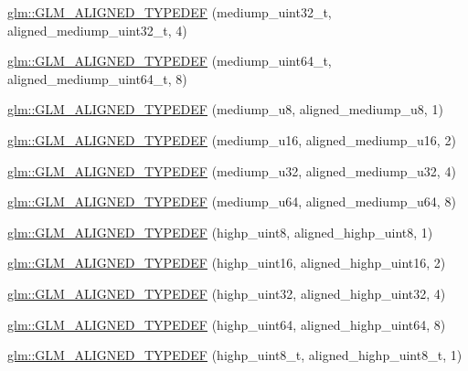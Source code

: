\begin{DoxyCompactItemize}
\item 
\hyperlink{group__gtx__type__aligned_ga1dc8bc6199d785f235576948d80a597c}{glm\+::\+G\+L\+M\+\_\+\+A\+L\+I\+G\+N\+E\+D\+\_\+\+T\+Y\+P\+E\+D\+E\+F} (mediump\+\_\+uint32\+\_\+t, aligned\+\_\+mediump\+\_\+uint32\+\_\+t, 4)
\item 
\hyperlink{group__gtx__type__aligned_gad14a0f2ec93519682b73d70b8e401d81}{glm\+::\+G\+L\+M\+\_\+\+A\+L\+I\+G\+N\+E\+D\+\_\+\+T\+Y\+P\+E\+D\+E\+F} (mediump\+\_\+uint64\+\_\+t, aligned\+\_\+mediump\+\_\+uint64\+\_\+t, 8)
\item 
\hyperlink{group__gtx__type__aligned_gada8b996eb6526dc1ead813bd49539d1b}{glm\+::\+G\+L\+M\+\_\+\+A\+L\+I\+G\+N\+E\+D\+\_\+\+T\+Y\+P\+E\+D\+E\+F} (mediump\+\_\+u8, aligned\+\_\+mediump\+\_\+u8, 1)
\item 
\hyperlink{group__gtx__type__aligned_ga28948f6bfb52b42deb9d73ae1ea8d8b0}{glm\+::\+G\+L\+M\+\_\+\+A\+L\+I\+G\+N\+E\+D\+\_\+\+T\+Y\+P\+E\+D\+E\+F} (mediump\+\_\+u16, aligned\+\_\+mediump\+\_\+u16, 2)
\item 
\hyperlink{group__gtx__type__aligned_gad6a7c0b5630f89d3f1c5b4ef2919bb4c}{glm\+::\+G\+L\+M\+\_\+\+A\+L\+I\+G\+N\+E\+D\+\_\+\+T\+Y\+P\+E\+D\+E\+F} (mediump\+\_\+u32, aligned\+\_\+mediump\+\_\+u32, 4)
\item 
\hyperlink{group__gtx__type__aligned_gaa0fc531cbaa972ac3a0b86d21ef4a7fa}{glm\+::\+G\+L\+M\+\_\+\+A\+L\+I\+G\+N\+E\+D\+\_\+\+T\+Y\+P\+E\+D\+E\+F} (mediump\+\_\+u64, aligned\+\_\+mediump\+\_\+u64, 8)
\item 
\hyperlink{group__gtx__type__aligned_ga0ee829f7b754b262bbfe6317c0d678ac}{glm\+::\+G\+L\+M\+\_\+\+A\+L\+I\+G\+N\+E\+D\+\_\+\+T\+Y\+P\+E\+D\+E\+F} (highp\+\_\+uint8, aligned\+\_\+highp\+\_\+uint8, 1)
\item 
\hyperlink{group__gtx__type__aligned_ga447848a817a626cae08cedc9778b331c}{glm\+::\+G\+L\+M\+\_\+\+A\+L\+I\+G\+N\+E\+D\+\_\+\+T\+Y\+P\+E\+D\+E\+F} (highp\+\_\+uint16, aligned\+\_\+highp\+\_\+uint16, 2)
\item 
\hyperlink{group__gtx__type__aligned_ga6027ae13b2734f542a6e7beee11b8820}{glm\+::\+G\+L\+M\+\_\+\+A\+L\+I\+G\+N\+E\+D\+\_\+\+T\+Y\+P\+E\+D\+E\+F} (highp\+\_\+uint32, aligned\+\_\+highp\+\_\+uint32, 4)
\item 
\hyperlink{group__gtx__type__aligned_ga2aca46c8608c95ef991ee4c332acde5f}{glm\+::\+G\+L\+M\+\_\+\+A\+L\+I\+G\+N\+E\+D\+\_\+\+T\+Y\+P\+E\+D\+E\+F} (highp\+\_\+uint64, aligned\+\_\+highp\+\_\+uint64, 8)
\item 
\hyperlink{group__gtx__type__aligned_gaff50b10dd1c48be324fdaffd18e2c7ea}{glm\+::\+G\+L\+M\+\_\+\+A\+L\+I\+G\+N\+E\+D\+\_\+\+T\+Y\+P\+E\+D\+E\+F} (highp\+\_\+uint8\+\_\+t, aligned\+\_\+highp\+\_\+uint8\+\_\+t, 1)

\end{DoxyCompactItemize}
